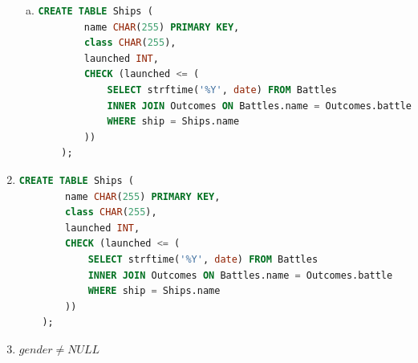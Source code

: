 \documentclass[12pt]{article}
\begin{document}
\begin{enumerate}[1.]
\begin{enumerate}[a)]
        \item

    \begin{lstlisting}[language=SQL]
    CREATE TABLE Ships (
        name CHAR(255) PRIMARY KEY,
        class CHAR(255),
        launched INT,
        CHECK (launched <= (
            SELECT strftime('%Y', date) FROM Battles
            INNER JOIN Outcomes ON Battles.name = Outcomes.battle
            WHERE ship = Ships.name
        ))
    );
    \end{lstlisting}

    \end{enumerate}

    \item

    \begin{lstlisting}[language=SQL]
    CREATE TABLE Ships (
        name CHAR(255) PRIMARY KEY,
        class CHAR(255),
        launched INT,
        CHECK (launched <= (
            SELECT strftime('%Y', date) FROM Battles
            INNER JOIN Outcomes ON Battles.name = Outcomes.battle
            WHERE ship = Ships.name
        ))
    );
    \end{lstlisting}

    \item $gender \neq NULL$

\end{enumerate}
\end{document}
